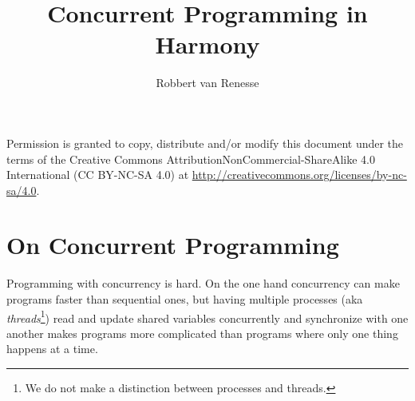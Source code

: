 \documentclass{report}
\title{Concurrent Programming in Harmony}
\author{Robbert van Renesse}
\begin{document}
\maketitle

Permission is granted to copy, distribute and/or modify this
document under the terms of the
Creative Commons AttributionNonCommercial-ShareAlike 4.0 International
(CC BY-NC-SA 4.0) at
\url{http://creativecommons.org/licenses/by-nc-sa/4.0}.

\tableofcontents

\chapter{On Concurrent Programming}

Programming with concurrency is hard.  On the one hand concurrency
can make programs faster than sequential ones, but having multiple
processes (aka \emph{threads}\footnote{We
%
do not make a distinction between processes and threads.})
read and update shared variables
%
concurrently and synchronize with one another makes programs more
complicated than programs where only one thing happens at a time.

%
%
%
%
%
\end{document}
